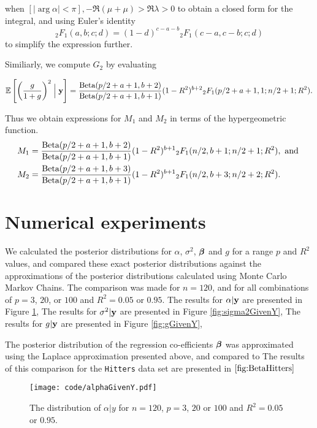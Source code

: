 \noindent when $[|\arg \alpha| < \pi], -\Re(\mu + \mu) > \Re \lambda > 0$ to obtain a closed form for the integral, and using Euler's identity
\[
	{}_2 F_1(a, b; c; d) = (1 - d)^{c - a -  b} {}_2 F_1(c - a, c - b; c; d)
\]
\noindent to simplify the expression further.

Similiarly, we compute $G_2$ by evaluating

\[
	\mathbb{E}\left[ \left(\frac{g}{1 + g} \right)^2 \Bigm| {\bf y} \right] = \frac{\text{Beta}(p/2 + a + 1, b + 2)}{\text{Beta}(p /2 + a + 1, b + 1)} (1 - R^2)^{b+2} {}_2 F_1(p/2 + a + 1, 1; n/2 + 1; R^2).
\]

\noindent Thus we obtain expressions for $M_1$ and $M_2$ in terms of the hypergeometric function.
\begin{align*}
	M_1 & = \frac{\text{Beta}(p/2 + a + 1, b + 2)}{\text{Beta}(p /2 + a + 1, b + 1)} (1 - R^2)^{b+1} {}_2 F_1(n/2, b + 1; n/2 + 1; R^2), \text{ and } \\
	M_2 & = \frac{\text{Beta}(p/2 + a + 1, b + 3)}{\text{Beta}(p /2 + a + 1, b + 1)} (1 - R^2)^{b+1} {}_2 F_1(n/2, b + 3; n/2 + 2; R^2).              
\end{align*}


\section{Numerical experiments}
\label{sec:num_exp}

We calculated the posterior distributions for $\alpha$, $\sigma^2$, ${\boldsymbol \beta}$ and $g$ for a range  $p$ and
$R^2$ values, and compared these exact posterior distributions against the approximations of the posterior
distributions calculated using Monte Carlo Markov Chains. The comparison was made for $n = 120$,  and for all
combinations of $p = 3$, $20$, or $100$ and $R^2 = 0.05$ or $0.95$.
The results for $\alpha | {\bf y}$ are presented in Figure \ref{fig:alphaGivenY},
The results for $\sigma^2 | {\bf y}$ are presented in Figure \ref{fig:sigma2GivenY},
The results for $g | {\bf y}$ are presented in Figure \ref{fig:gGivenY},

The posterior distribution of the regression co-efficients ${\boldsymbol \beta}$ was approximated using the Laplace 
approximation presented above, and compared to %
The results of this comparison for the \texttt{Hitters} data set are presented in $\ref{fig:BetaHitters}$

\begin{figure}
	\texttt{[image: code/alphaGivenY.pdf]}
	\label{fig:alphaGivenY}
	\caption{The distribution of $\alpha | y$ for $n = 120$, $p = 3$, $20$ or $100$ and $R^2 = 0.05$ or $0.95$.}
\end{figure}


